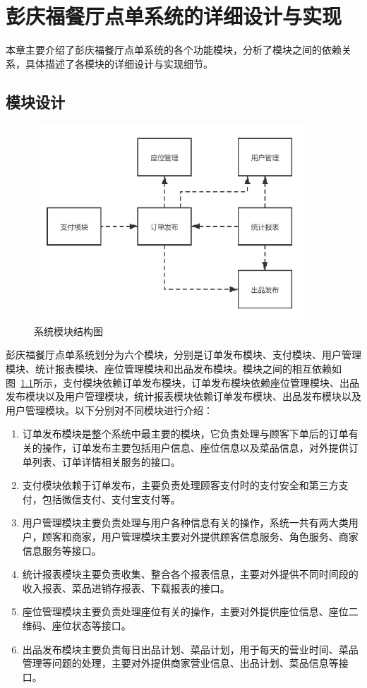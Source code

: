 \chapter{彭庆福餐厅点单系统的详细设计与实现}
本章主要介绍了彭庆福餐厅点单系统的各个功能模块，分析了模块之间的依赖关系，具体描述了各模块的详细设计与实现细节。
\section{模块设计}
\begin{figure}[htbp!]
    \centering
    \includegraphics[width=4in]{FIGs/chapter4/model.pdf}
    \caption{系统模块结构图}\label{fig_model}
\end{figure}

彭庆福餐厅点单系统划分为六个模块，分别是订单发布模块、支付模块、用户管理模块、统计报表模块、座位管理模块和出品发布模块。模块之间的相互依赖如图~\ref{fig_model}所示，支付模块依赖订单发布模块，订单发布模块依赖座位管理模块、出品发布模块以及用户管理模块，统计报表模块依赖订单发布模块、出品发布模块以及用户管理模块。以下分别对不同模块进行介绍：

\begin{enumerate}
    \item 订单发布模块是整个系统中最主要的模块，它负责处理与顾客下单后的订单有关的操作，订单发布主要包括用户信息、座位信息以及菜品信息，对外提供订单列表、订单详情相关服务的接口。
    \item 支付模块依赖于订单发布，主要负责处理顾客支付时的支付安全和第三方支付，包括微信支付、支付宝支付等。
    \item 用户管理模块主要负责处理与用户各种信息有关的操作，系统一共有两大类用户，顾客和商家，用户管理模块主要对外提供顾客信息服务、角色服务、商家信息服务等接口。
    \item 统计报表模块主要负责收集、整合各个报表信息，主要对外提供不同时间段的收入报表、菜品进销存报表、下载报表的接口。
    \item 座位管理模块主要负责处理座位有关的操作，主要对外提供座位信息、座位二维码、座位状态等接口。
    \item 出品发布模块主要负责每日出品计划、菜品计划，用于每天的营业时间、菜品管理等问题的处理，主要对外提供商家营业信息、出品计划、菜品信息等接口。
\end{enumerate}

